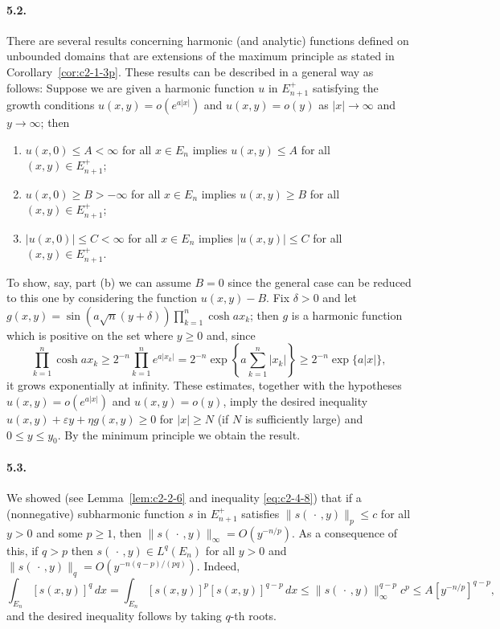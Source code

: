 \paragraph{5.2.} There are several results concerning harmonic (and analytic) functions defined on unbounded domains that are extensions of the maximum principle as stated in Corollary~\ref{cor:c2-1-3p}. These results can be described in a general way as follows: Suppose we are given a harmonic function $u$ in $E_{n+1}^+$ satisfying the growth conditions $u(x, y) = o(e^{a|x|})$ and $u(x, y) = o(y)$ as $|x| \to \infty$ and $y \to \infty$; then
\begin{enumerate}
\item[(a)] $u(x, 0) \leq A < \infty$ for all $x \in E_n$ implies $u(x, y) \leq A$ for all $(x, y) \in E_{n+1}^+$;
\item[(b)] $u(x, 0) \geq B > -\infty$ for all $x \in E_n$ implies $u(x, y) \geq B$ for all $(x, y) \in E_{n+1}^+$;
\item[(c)] $|u(x, 0)| \leq C < \infty$ for all $x \in E_n$ implies $|u(x, y)| \leq C$ for all $(x, y) \in E_{n+1}^+$.
\end{enumerate}
To show, say, part (b) we can assume $B = 0$ since the general case can be reduced to this one by considering the function $u(x, y) - B$. Fix $\delta > 0$ and let $g(x, y) = \sin(a\sqrt{n}(y + \delta)) \prod_{k=1}^n \cosh a x_k$; then $g$ is a harmonic function which is positive on the set where $y \geq 0$ and, since
\[
\prod_{k=1}^n \cosh a x_k \geq 2^{-n} \prod_{k=1}^n e^{a|x_k|} = 2^{-n} \exp\left\{a\sum_{k=1}^n |x_k|\right\} \geq 2^{-n} \exp\{a|x|\},
\]
it grows exponentially at infinity. These estimates, together with the hypotheses $u(x, y) = o(e^{a|x|})$ and $u(x, y) = o(y)$, imply the desired inequality $u(x, y) + \varepsilon y + \eta g(x, y) \geq 0$ for $|x| \geq N$ (if $N$ is sufficiently large) and $0 \leq y \leq y_0$. By the minimum principle we obtain the result.

\paragraph{5.3.} We showed (see Lemma~\ref{lem:c2-2-6} and inequality \eqref{eq:c2-4-8}) that if a (nonnegative) subharmonic function $s$ in $E_{n+1}^+$ satisfies $\|s(\,\cdot\,, y)\|_p \leq c$ for all $y > 0$ and some $p \geq 1$, then $\|s(\,\cdot\,, y)\|_\infty = O(y^{-n/p})$. As a consequence of this, if $q > p$ then $s(\,\cdot\,, y) \in L^q(E_n)$ for all $y > 0$ and $\|s(\,\cdot\,, y)\|_q = O(y^{-n(q-p)/(pq)})$. Indeed,
\[
\int_{E_n} [s(x, y)]^q\,dx = \int_{E_n} [s(x, y)]^p [s(x, y)]^{q-p}\,dx \leq \|s(\,\cdot\,, y)\|_\infty^{q-p} c^p \leq A[y^{-n/p}]^{q-p},
\]
and the desired inequality follows by taking $q$-th roots.

